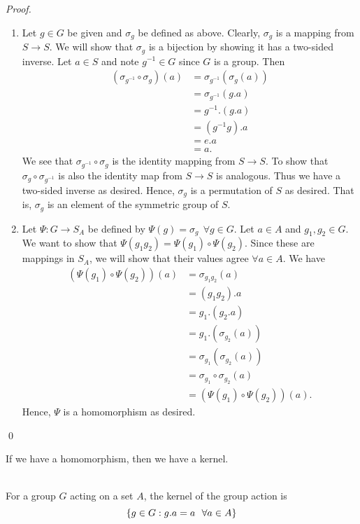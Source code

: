 \begin{proof}
    \begin{enumerate}
        \item Let $g\in G$ be given and $\sigma_g$ be defined as above. Clearly, $\sigma_g$ is a mapping from $S \to S$. We will show that $\sigma_g$ is a bijection by showing it has a two-sided inverse. Let $a \in S$ and note $g^{-1}\in G$ since $G$ is a group. Then
        \begin{align*}
            \left(\sigma_{g^{-1}} \circ \sigma_g \right)(a) &= \sigma_{g^{-1}}(\sigma_g(a)) \\
            &= \sigma_{g^{-1}}(g.a) \\
            &= g^{-1}.(g.a) \\
            &= (g^{-1}g).a \\
            &= e.a \\
            &= a.
        \end{align*}
        We see that $\sigma_{g^{-1}} \circ \sigma_g$ is the identity mapping from $S \to S$. To show that $\sigma_g \circ \sigma_{g^{-1}}$ is also the identity map from $S \to S$ is analogous. Thus we have a two-sided inverse as desired. Hence, $\sigma_g$ is a permutation of $S$ as desired. That is, $\sigma_g$ is an element of the symmetric group of $S$.

        \item Let $\Psi: G \to S_A$ be defined by $\Psi(g) = \sigma_g ~~\forall g \in G$. Let $a \in A$ and $g_1, g_2 \in G$. We want to show that $\Psi(g_1g_2) = \Psi(g_1) \circ \Psi(g_2)$. Since these are mappings in $S_A$, we will show that their values agree $\forall a \in A$. We have
        \begin{align*}
            \left(\Psi(g_1) \circ \Psi(g_2)\right)(a) &= \sigma_{g_1g_2}(a) \\
            &= (g_1g_2).a \\
            &= g_1.(g_2.a) \\
            &= g_1.(\sigma_{g_2}(a)) \\
            &= \sigma_{g_1}(\sigma_{g_2}(a)) \\
            &= \sigma_{g_1} \circ \sigma_{g_2}(a) \\
            &= \left(\Psi(g_1) \circ \Psi(g_2)\right)(a).
        \end{align*}
        Hence, $\Psi$ is a homomorphism as desired.
    \end{enumerate}
    \qed
\end{proof}

If we have a homomorphism, then we have a kernel.

\begin{definition} \leavevmode \\
    For a group $G$ acting on a set $A$, the kernel of the group action is
    $$\left\{g \in G : g.a = a ~~\forall a \in A\right\}$$
\end{definition}